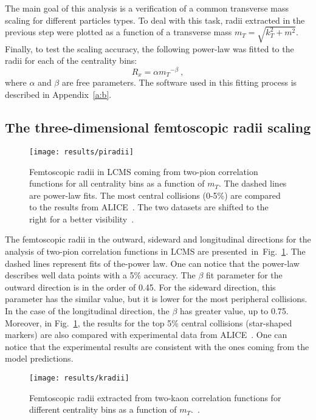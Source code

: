     The main goal of this analysis is a verification of a common transverse mass scaling for different particles types.
    To deal with this task, radii extracted in the previous step were plotted as a function of a transverse mass $m_T = \sqrt{k_T^2 +m^2}$.
    Finally, to test the scaling accuracy, the following power-law was fitted to the radii for each of the centrality bins:
    \begin{equation}
      \label{eq:power-law}
      R_x = \alpha {m_T}^{-\beta}~,
    \end{equation}
    where $\alpha$ and $\beta$ are free parameters.
    The software used in this fitting process is described in Appendix~\ref{a:b}.
    \subsection{The three-dimensional femtoscopic radii scaling}
      \begin{figure}[b]
        \centering
        \centerline{\texttt{[image: results/piradii]}}
        \caption{Femtoscopic radii in LCMS coming from two-pion correlation functions for all centrality bins as a function of $m_T$. The dashed lines are power-law fits. The most central collisions (0-5\%) are compared to the results from ALICE~\cite{alice_pion}. The two datasets are shifted to the right for a better visibility~\cite{galazyn}.}
        \label{fig:piradii}
      \end{figure}
      The femtoscopic radii in the outward, sideward and longitudinal directions for the analysis of two-pion correlation functions in LCMS are presented~in~Fig.~\ref{fig:piradii}.
      The dashed lines represent fits of the-power law.
      One can notice that the power-law describes well data points with a 5\% accuracy.
      The $\beta$ fit parameter for the outward direction is in the order of 0.45.
      For the sideward direction, this parameter has the similar value, but it is lower for the most peripheral collisions.
      In the case of the longitudinal direction, the $\beta$ has greater value, up to 0.75.
      Moreover, in Fig.~\ref{fig:piradii}, the results for the top 5\% central collisions (star-shaped markers) are also compared with experimental data from ALICE~\cite{alice_pion}.
      One can notice that the experimental results are consistent with the ones coming from the model predictions.
      \begin{figure}[b]
        \centering
        \centerline{\texttt{[image: results/kradii]}}
        \caption{Femtoscopic radii extracted from two-kaon correlation functions for different centrality bins as a function of $m_T$.~\cite{galazyn}.}
      \label{fig:kradii}
      \end{figure}

